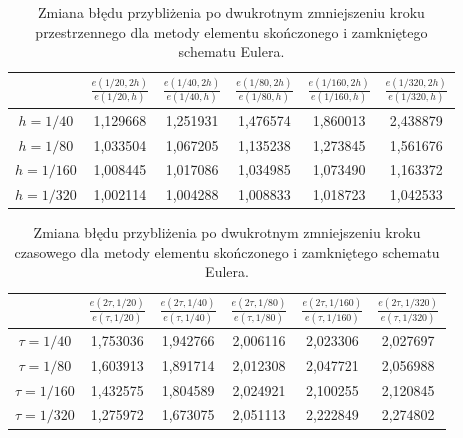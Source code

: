 \documentclass{article}
\begin{document}
	\begin{table}[h!]
			\caption{Zmiana błędu przybliżenia po dwukrotnym zmniejszeniu kroku przestrzennego dla metody elementu skończonego i zamkniętego schematu Eulera.}
			\centering
			\begin{tabular}{|c|c|c|c|c|c|}
				\hline
				& $\frac{e(1/20,2h)}{e(1/20,h)}$ &  $\frac{e(1/40,2h)}{e(1/40,h)}$ &  $\frac{e(1/80,2h)}{e(1/80,h)}$ &  $\frac{e(1/160,2h)}{e(1/160,h)}$ &  $\frac{e(1/320,2h)}{e(1/320,h)}$ \\
				\hline
				$h=1/40$  &  1,129668 &  1,251931 &  1,476574 & 1,860013 &  2,438879 \\
				\hline
				$h=1/80$  &1,033504 & 1,067205 & 1,135238 &  1,273845 &  1,561676 \\
				\hline
				$h=1/160$ & 1,008445 &1,017086 & 1,034985 & 1,073490 & 1,163372 \\
				\hline
				$h=1/320$ & 1,002114 & 1,004288 & 1,008833 & 1,018723 &  1,042533 \\
				\hline
			\end{tabular}
	\end{table}
	\begin{table}[h!]
			\caption{Zmiana błędu przybliżenia po dwukrotnym zmniejszeniu kroku czasowego dla metody elementu skończonego i zamkniętego schematu Eulera.}
			\centering
			\begin{tabular}{|c|c|c|c|c|c|}
				\hline
				& $\frac{e(2\tau,1/20)}{e(\tau,1/20)}$ &  $\frac{e(2\tau,1/40)}{e(\tau,1/40)}$ &  $\frac{e(2\tau,1/80)}{e(\tau,1/80)}$ &  $\frac{e(2\tau,1/160)}{e(\tau,1/160)}$ &  $\frac{e(2\tau,1/320)}{e(\tau,1/320)}$ \\
				\hline
				$\tau=1/40$ & 1,753036 &1,942766 & 2,006116 &  2,023306 & 2,027697 \\
				\hline
				$\tau=1/80$  &1,603913 & 1,891714 & 2,012308 &  2,047721 &  2,056988 \\
				\hline
				$\tau=1/160$ & 1,432575 & 1,804589 &  2,024921 & 2,100255 & 2,120845 \\
				\hline
				$\tau=1/320$ & 1,275972 &1,673075 & 2,051113 & 2,222849 &2,274802 \\
				\hline
	\end{tabular}
\end{table}
\newpage		
\end{document}
